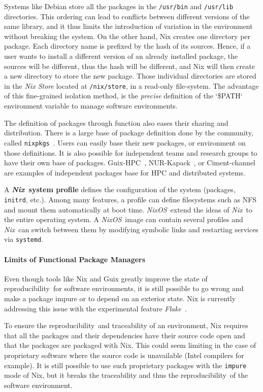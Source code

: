 \documentclass[sigconf,natbib=false]{acmart}
\newcommand{\repro}{reproducibility}
\newcommand{\nix}{\emph{Nix}}
\newcommand{\nixos}{\emph{NixOS}}
\begin{document}
Systems like Debian store all the packages in the \texttt{/usr/bin} and \texttt{/usr/lib} directories.
This ordering can lead to conflicts between different versions of the same library, and it thus limits the introduction of variation in the environment without breaking the system.
On the other hand, Nix creates one directory per package.
Each directory name is prefixed by the hash of its sources.
Hence, if a user wants to install a different version of an already installed package, the sources will be different, thus the hash will be different, and Nix will then create a new directory to store the new package.
Those individual directories are stored in the \emph{Nix Store} located at \texttt{/nix/store}, in a read-only file-system.
The advantage of this fine-grained isolation method, is the \emph{precise} definition of the `\$PATH` environment variable to manage software environments.

The definition of packages through function also eases their sharing and distribution.
There is a large base of package definition done by the community, called \texttt{nixpkgs}\ \cite{nixpkgs}.
Users can easily base their new packages, or environment on those definitions.
It is also possible for independent teams and research groups to have their own base of packages.
Guix-HPC\ \cite{guix-hpc}, NUR-Kapack\ \cite{kapack}, or Ciment-channel\ \cite{ciment_channel} are examples of independent packages base for HPC and distributed systems.

A \textbf{\nix\ system profile} defines the configuration of the system (packages, \texttt{initrd}, etc.).
Among many features, a profile can define filesystems such as NFS and mount them automatically at boot time.
\nixos\ extend the ideas of \nix\ to the entire operating system.
A \nixos\ image can contain several profiles and \nix\ can switch between them by modifying symbolic links and restarting services via \texttt{systemd}.

\paragraph{Limits of Functional Package Managers}

Even though tools like Nix and Guix greatly improve the state of \repro\ for software environments, it is still possible to go wrong and make a package impure or to depend on an exterior state.
Nix is currently addressing this issue with the experimental feature \emph{Flake}\ \cite{flakes}.

To ensure the \repro\ and traceability of an environment, Nix requires that all the packages and their dependencies have their source code open and that the packages are packaged with Nix.
This could seem limiting in the case of proprietary software where the source code is unavailable (Intel compilers for example).
It is still possible to use such proprietary packages with the \texttt{impure} mode of Nix, but it breaks the traceability and thus the \repro\ of the software environment. 
\end{document}
